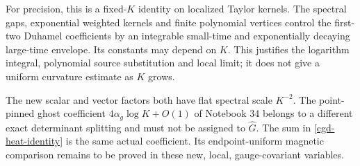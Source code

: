 For precision, this is a fixed-\(K\) identity on
localized Taylor kernels. The spectral gaps,
exponential weighted kernels and finite polynomial
vertices control the first-two Duhamel coefficients
by an integrable small-time and exponentially
decaying large-time envelope. Its constants may
depend on \(K\). This justifies the logarithm
integral, polynomial source substitution and local
limit; it does not give a uniform curvature
estimate as \(K\) grows.

The new scalar and vector factors both have flat
spectral scale \(K^{-2}\). The point-pinned ghost
coefficient \(4\alpha_g\log K+O(1)\) of Notebook 34
belongs to a different exact determinant splitting
and must not be assigned to \(\widehat G\).
The sum in \eqref{cgd-heat-identity} is the same
actual coefficient. Its endpoint-uniform magnetic
comparison remains to be proved in these new,
local, gauge-covariant variables.
